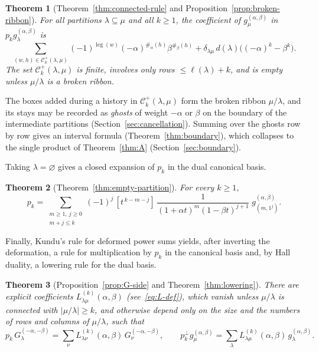 \documentclass[11pt]{amsart}
\numberwithin{equation}{section}
\newtheorem{maintheorem}{Theorem}
\theoremstyle{definition}
\theoremstyle{remark}
\newcommand{\leg}{\operatorname{leg}}
\newcommand{\one}{\varnothing}
\newcommand{\cC}{\mathcal C}
\begin{document}
\begin{maintheorem}[Theorem~\ref{thm:connected-rule}
and Proposition~\ref{prop:broken-ribbon}]\label{thm:B}
For all partitions $\lambda\subseteq\mu$ and all $k\geq1$, the coefficient
of $g^{(\alpha,\beta)}_\mu$ in $p_kg^{(\alpha,\beta)}_\lambda$ is
\[
 \sum_{(w,h)\in\cC^+_k(\lambda,\mu)}
  (-1)^{\leg(w)}(-\alpha)^{\#_\alpha(h)}\beta^{\#_\beta(h)}
 +\delta_{\lambda\mu}\,d(\lambda)\bigl((-\alpha)^k-\beta^k\bigr).
\]
The set $\cC^+_k(\lambda,\mu)$ is finite, involves only rows
$\leq\ell(\lambda)+k$, and is empty unless $\mu/\lambda$ is a broken ribbon.
\end{maintheorem}

The boxes added during a history in $\cC^+_k(\lambda,\mu)$
form the broken ribbon $\mu/\lambda$, and its stays may be recorded as \emph{ghosts} of weight
$-\alpha$ or $\beta$ on the boundary of the intermediate partitions
(Section~\ref{sec:cancellation}). Summing over the ghosts row by row gives an interval formula
(Theorem~\ref{thm:boundary}), which collapses to the single product of
Theorem~\ref{thm:A} (Section~\ref{sec:boundary}). 

Taking $\lambda=\one$ gives a closed expansion of $p_k$ in the dual
canonical basis.

\begin{maintheorem}[Theorem~\ref{thm:empty-partition}]\label{thm:C}
For every $k\geq1$,
\[
 p_k=\sum_{\substack{m\geq1,\ j\geq0\\ m+j\leq k}}
 (-1)^j\,[t^{\,k-m-j}]\,\frac{1}{(1+\alpha t)^m(1-\beta t)^{j+1}}\;
 g^{(\alpha,\beta)}_{(m,1^j)} .
\]
\end{maintheorem}

Finally, Kundu's rule for deformed power sums yields, after inverting the
deformation, a rule for multiplication by $p_k$ in the canonical basis and,
by Hall duality, a lowering rule for the dual basis.

\begin{maintheorem}[Proposition~\ref{prop:G-side} and
Theorem~\ref{thm:lowering}]\label{thm:D}
There are explicit coefficients $L^{(k)}_{\lambda\mu}(\alpha,\beta)$
(see~\eqref{eq:L-def}), which vanish unless $\mu/\lambda$ is connected with
$|\mu/\lambda|\geq k$, and otherwise depend only on the size and the numbers
of rows and columns of $\mu/\lambda$, such that
\[
 p_k\,G^{(-\alpha,-\beta)}_\lambda=\sum_\nu L^{(k)}_{\lambda\nu}(\alpha,\beta)\,
 G^{(-\alpha,-\beta)}_\nu,
 \qquad
 p_k^\perp g^{(\alpha,\beta)}_\mu=\sum_\lambda L^{(k)}_{\lambda\mu}(\alpha,\beta)\,
 g^{(\alpha,\beta)}_\lambda .
\]
\end{maintheorem}
\end{document}
